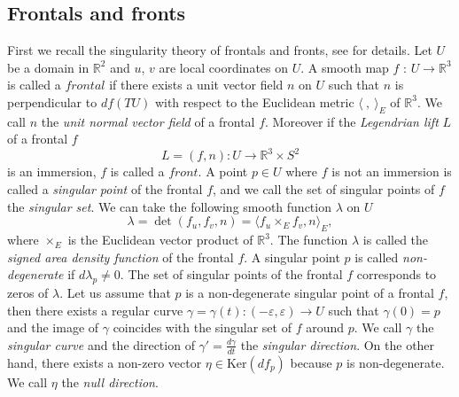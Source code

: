 \documentclass[11pt,reqno]{amsart}
\theoremstyle{plain} %
\theoremstyle{definition}
\begin{document}
\subsection{Frontals and fronts}
First we recall the singularity theory of frontals and fronts, see \cite{A, FSUY, SUY09, UY} for details. Let $U$ be a domain in $\mathbb{R}^2$ and $u$, $v$ are local coordinates on $U$. A smooth map $f$ : $U \longrightarrow \mathbb{R}^3$ is called a $frontal$ if there exists a unit vector field $n$ on $U$ such that $n$ is perpendicular to $df(TU)$ with respect to the Euclidean metric $\langle \  ,\  \rangle_E$ of $\mathbb{R}^3$. We call $n$ the {\it unit normal vector field} of a frontal $f$. Moreover if the {\it Legendrian lift} $L$ of a frontal $f$ 
\begin{equation*}
L=(f,n): U \longrightarrow \mathbb{R}^3\times S^2
\end{equation*}
is an immersion, $f$ is called a $front$. A point $p\in U$ where $f$ is not an immersion is called a {\it singular point} of the frontal $f$, and we call the set of singular points of $f$ the {\it singular set}. We can take the following smooth function $\lambda$ on $U$ 
\begin{equation*}
\lambda = \det(f_u, f_v, n)=\langle f_u \times_E f_v, n \rangle_E,
\end{equation*}
where $\times_E$ is the Euclidean vector product of $\mathbb{R}^3$. The function $\lambda$ is called the {\it signed area density function} of the frontal $f$. A singular point $p$ is called {\it non-degenerate} if $d\lambda_p \neq0$. 
The set of singular points of the frontal $f$ corresponds to zeros of $\lambda$. Let us assume that $p$ is a non-degenerate singular point of a frontal $f$, then there exists a regular curve $\gamma=\gamma(t): (-\varepsilon, \varepsilon)\longrightarrow U$ such that $\gamma(0)=p$ and the image of $\gamma$ coincides with the singular set of $f$ around $p$. We call $\gamma$ the {\it singular curve} and the direction of $\gamma'=\frac{d\gamma}{dt}$ the {\it singular direction}. On the other hand, there exists a non-zero vector $\eta \in \mathrm{Ker}(df_p)$ because $p$ is non-degenerate. We call $\eta$ the {\it null direction}.
\end{document}
